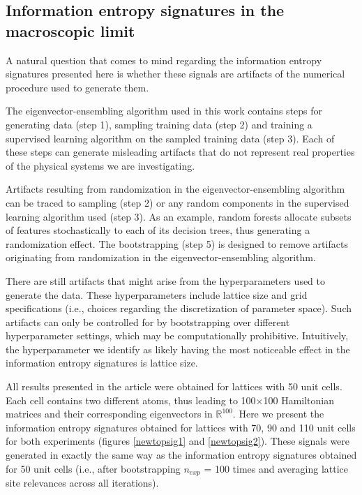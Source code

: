 \documentclass[fleqn,10pt]{wlscirep}
\begin{document}
\subsection*{Information entropy signatures in the macroscopic limit}

A natural question that comes to mind regarding the information entropy signatures presented here is whether these signals are artifacts of the numerical procedure used to generate them.

The eigenvector-ensembling algorithm used in this work contains steps for generating data (step 1), sampling training data (step 2) and training a supervised learning algorithm on the sampled training data (step 3). Each of these steps can generate misleading artifacts that do not represent real properties of the physical systems we are investigating.

Artifacts resulting from randomization in the eigenvector-ensembling algorithm can be traced to sampling (step 2) or any random components in the supervised learning algorithm used (step 3). As an example, random forests allocate subsets of features stochastically to each of its decision trees, thus generating a randomization effect. The bootstrapping (step 5) is designed to remove artifacts originating from randomization in the eigenvector-ensembling algorithm.

There are still artifacts that might arise from the hyperparameters used to generate the data. These hyperparameters include lattice size and grid specifications (i.e., choices regarding the discretization of parameter space). Such artifacts can only be controlled for by bootstrapping over different hyperparameter settings, which may be computationally prohibitive. Intuitively, the hyperparameter we identify as likely having the most noticeable effect in the information entropy signatures is lattice size.

All results presented in the article were obtained for lattices with 50 unit cells. Each cell contains two different atoms, thus leading to 100$\times$100 Hamiltonian matrices and their corresponding eigenvectors in $\mathbb{R}^{100}$. Here we present the information entropy signatures obtained for lattices with 70, 90 and 110 unit cells for both experiments (figures \ref{newtopsig1} and \ref{newtopsig2}). These signals were generated in exactly the same way as the information entropy signatures obtained for 50 unit cells (i.e., after bootstrapping $n_{exp}$ = 100 times and averaging lattice site relevances across all iterations).
\end{document}

